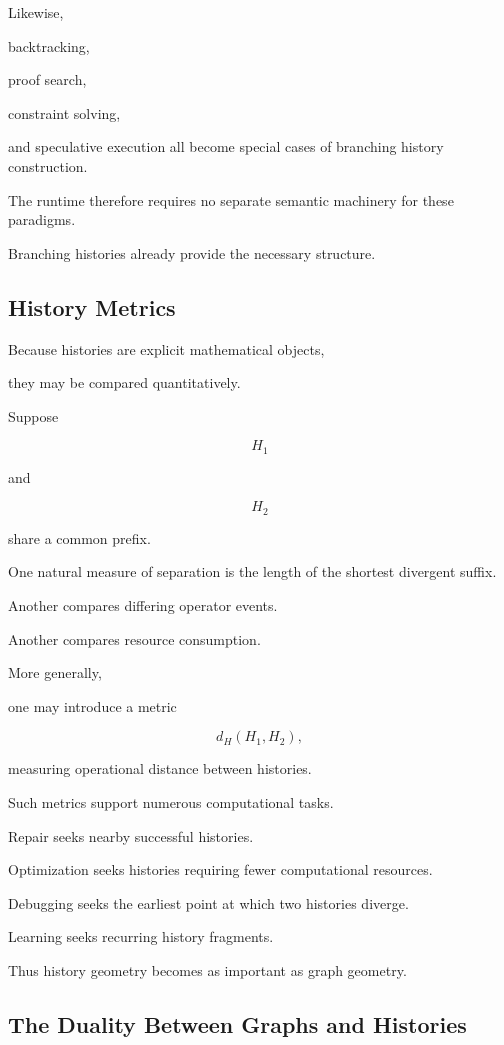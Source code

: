\documentclass[12pt,oneside]{article}
\begin{document}
Likewise,

backtracking,

proof search,

constraint solving,

and speculative execution all become special cases of branching history construction.

The runtime therefore requires no separate semantic machinery for these paradigms.

Branching histories already provide the necessary structure.

\subsection{History Metrics}

Because histories are explicit mathematical objects,

they may be compared quantitatively.

Suppose

\[
H_1
\]

and

\[
H_2
\]

share a common prefix.

One natural measure of separation is the length of the shortest divergent suffix.

Another compares differing operator events.

Another compares resource consumption.

More generally,

one may introduce a metric

\[
d_H(H_1,H_2),
\]

measuring operational distance between histories.

Such metrics support numerous computational tasks.

Repair seeks nearby successful histories.

Optimization seeks histories requiring fewer computational resources.

Debugging seeks the earliest point at which two histories diverge.

Learning seeks recurring history fragments.

Thus history geometry becomes as important as graph geometry.

\subsection{The Duality Between Graphs and Histories}
\end{document}
